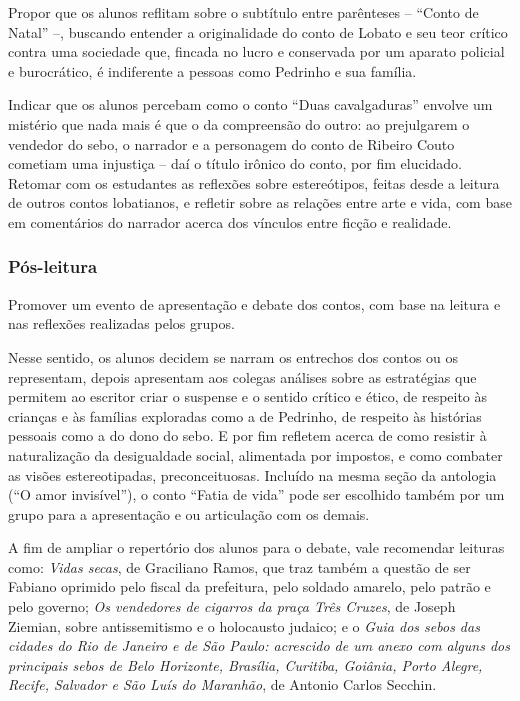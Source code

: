 \documentclass[11pt]{extarticle}
\begin{document}
Propor que os alunos reflitam sobre o subtítulo entre parênteses --
``Conto de Natal'' --, buscando entender a originalidade do conto de
Lobato e seu teor crítico contra uma sociedade que, fincada no lucro e
conservada por um aparato policial e burocrático, é indiferente a
pessoas como Pedrinho e sua família.

Indicar que os alunos percebam como o conto ``Duas cavalgaduras''
envolve um mistério que nada mais é que o da compreensão do outro: ao
prejulgarem o vendedor do sebo, o narrador e a personagem do conto de
Ribeiro Couto cometiam uma injustiça -- daí o título irônico do conto,
por fim elucidado. Retomar com os estudantes as reflexões sobre
estereótipos, feitas desde a leitura de outros contos lobatianos, e
refletir sobre as relações entre arte e vida, com base em comentários do
narrador acerca dos vínculos entre ficção e realidade.

\subsubsection{Pós-leitura}

Promover um evento de apresentação e debate dos contos, com base na
leitura e nas reflexões realizadas pelos grupos.

Nesse sentido, os alunos decidem se narram os entrechos dos contos ou os
representam, depois apresentam aos colegas análises sobre as estratégias
que permitem ao escritor criar o suspense e o sentido crítico e ético,
de respeito às crianças e às famílias exploradas como a de Pedrinho, de
respeito às histórias pessoais como a do dono do sebo. E por fim
refletem acerca de como resistir à naturalização da desigualdade social,
alimentada por impostos, e como combater as visões estereotipadas,
preconceituosas. Incluído na mesma seção da antologia (``O amor
invisível''), o conto ``Fatia de vida'' pode ser escolhido também por um
grupo para a apresentação e ou articulação com os demais.

A fim de ampliar o repertório dos alunos para o debate, vale recomendar
leituras como: \emph{Vidas secas}, de Graciliano Ramos, que traz também
a questão de ser Fabiano oprimido pelo fiscal da prefeitura, pelo
soldado amarelo, pelo patrão e pelo governo; \emph{Os vendedores de
cigarros da praça Três Cruzes}, de Joseph Ziemian, sobre antissemitismo
e o holocausto judaico; e o \emph{Guia dos sebos das cidades do Rio de
Janeiro e de São Paulo: acrescido de um anexo com alguns dos principais
sebos de Belo Horizonte, Brasília, Curitiba, Goiânia, Porto Alegre,
Recife, Salvador e São Luís do Maranhão}, de Antonio Carlos Secchin.
\end{document}
